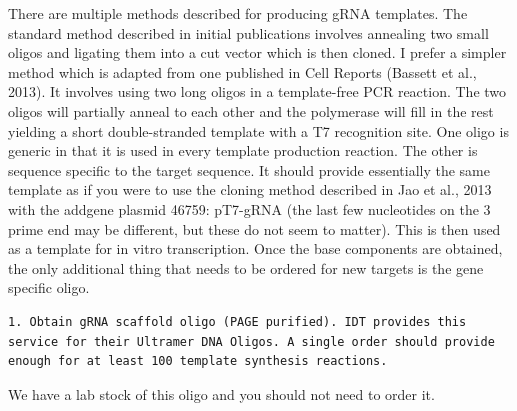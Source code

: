 \documentclass[
  letterpaper,
  DIV=11,
  numbers=noendperiod]{scrreprt}
\begin{document}
\begin{tcolorbox}[enhanced jigsaw, rightrule=.15mm, title=\textcolor{quarto-callout-note-color}{\faInfo}\hspace{0.5em}{Notes}, titlerule=0mm, opacitybacktitle=0.6, toprule=.15mm, bottomrule=.15mm, opacityback=0, left=2mm, colframe=quarto-callout-note-color-frame, breakable, coltitle=black, colback=white, colbacktitle=quarto-callout-note-color!10!white, bottomtitle=1mm, leftrule=.75mm, toptitle=1mm, arc=.35mm]

There are multiple methods described for producing gRNA templates. The
standard method described in initial publications involves annealing two
small oligos and ligating them into a cut vector which is then cloned. I
prefer a simpler method which is adapted from one published in Cell
Reports (Bassett et al., 2013). It involves using two long oligos in a
template-free PCR reaction. The two oligos will partially anneal to each
other and the polymerase will fill in the rest yielding a short
double-stranded template with a T7 recognition site. One oligo is
generic in that it is used in every template production reaction. The
other is sequence specific to the target sequence. It should provide
essentially the same template as if you were to use the cloning method
described in Jao et al., 2013 with the addgene plasmid 46759: pT7-gRNA
(the last few nucleotides on the 3 prime end may be different, but these
do not seem to matter). This is then used as a template for in vitro
transcription. Once the base components are obtained, the only
additional thing that needs to be ordered for new targets is the gene
specific oligo.

\end{tcolorbox}

\begin{verbatim}
1. Obtain gRNA scaffold oligo (PAGE purified). IDT provides this service for their Ultramer DNA Oligos. A single order should provide enough for at least 100 template synthesis reactions.  
\end{verbatim}

\begin{tcolorbox}[enhanced jigsaw, rightrule=.15mm, title=\textcolor{quarto-callout-note-color}{\faInfo}\hspace{0.5em}{Notes}, titlerule=0mm, opacitybacktitle=0.6, toprule=.15mm, bottomrule=.15mm, opacityback=0, left=2mm, colframe=quarto-callout-note-color-frame, breakable, coltitle=black, colback=white, colbacktitle=quarto-callout-note-color!10!white, bottomtitle=1mm, leftrule=.75mm, toptitle=1mm, arc=.35mm]

We have a lab stock of this oligo and you should not need to order it.

\end{tcolorbox}
\end{document}
